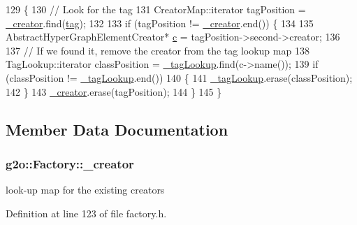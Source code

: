 \begin{DoxyCode}
129   \{
130     \textcolor{comment}{// Look for the tag}
131     CreatorMap::iterator tagPosition = \hyperlink{classg2o_1_1Factory_a38e27fb1014dfb8691f4df045ebb5130}{\_creator}.find(\hyperlink{classg2o_1_1Factory_a337d1377ea4e47c31dd04e85e51a2516}{tag});
132 
133     \textcolor{keywordflow}{if} (tagPosition != \hyperlink{classg2o_1_1Factory_a38e27fb1014dfb8691f4df045ebb5130}{\_creator}.end()) \{
134 
135       AbstractHyperGraphElementCreator* \hyperlink{sparse__block__matrix_8hpp_a4e1e0e72dd773439e333c84dd762a9c3}{c} = tagPosition->second->creator;
136 
137       \textcolor{comment}{// If we found it, remove the creator from the tag lookup map}
138       TagLookup::iterator classPosition = \hyperlink{classg2o_1_1Factory_a93fbd79ea000ed88101c1f23b19e6e2a}{\_tagLookup}.find(c->name());
139       \textcolor{keywordflow}{if} (classPosition != \hyperlink{classg2o_1_1Factory_a93fbd79ea000ed88101c1f23b19e6e2a}{\_tagLookup}.end())
140         \{
141           \hyperlink{classg2o_1_1Factory_a93fbd79ea000ed88101c1f23b19e6e2a}{\_tagLookup}.erase(classPosition);
142         \}
143       \hyperlink{classg2o_1_1Factory_a38e27fb1014dfb8691f4df045ebb5130}{\_creator}.erase(tagPosition);
144     \}
145   \}
\end{DoxyCode}


\subsection{Member Data Documentation}
\subsubsection[{\texorpdfstring{\+\_\+creator}{_creator}}]{ g2o\+::\+Factory\+::\+\_\+creator\hspace{0.3cm}{\ttfamily [protected]}}\hypertarget{classg2o_1_1Factory_a38e27fb1014dfb8691f4df045ebb5130}{}\label{classg2o_1_1Factory_a38e27fb1014dfb8691f4df045ebb5130}


look-\/up map for the existing creators 



Definition at line 123 of file factory.\+h.

